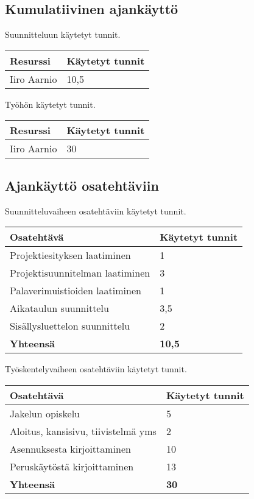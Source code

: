 \documentclass[a4paper, 12pt, finnish]{article}
\begin{document}
\subsection{Kumulatiivinen ajankäyttö}
Suunnitteluun käytetyt tunnit.
\begin{table}[htpb]
\begin{tabular}{|l|l|}
\hline
Resurssi & Käytetyt tunnit \\ \hline
Iiro Aarnio & 10,5 \\ \hline
\end{tabular}%
\end{table}

Työhön käytetyt tunnit.
\begin{table}[htpb]
\begin{tabular}{|l|l|}
\hline
Resurssi & Käytetyt tunnit \\ \hline
Iiro Aarnio & 30 \\ \hline
\end{tabular}%
\end{table}

\subsection{Ajankäyttö osatehtäviin}

Suunnitteluvaiheen osatehtäviin käytetyt tunnit.
\begin{table}[!htpb]
\begin{tabular}{|l|l|}
\hline
Osatehtävä & Käytetyt tunnit \\ \hline
Projektiesityksen laatiminen & 1 \\ \hline
Projektisuunnitelman laatiminen & 3 \\ \hline
Palaverimuistioiden laatiminen & 1 \\ \hline
Aikataulun suunnittelu & 3,5 \\ \hline
Sisällysluettelon suunnittelu & 2 \\ \hline
    \textbf{Yhteensä} & \textbf{10,5}  \\ \hline
\end{tabular}%
\end{table}

Työskentelyvaiheen osatehtäviin käytetyt tunnit.
\begin{table}[!htpb]
\begin{tabular}{|l|l|}
\hline
Osatehtävä & Käytetyt tunnit \\ \hline
Jakelun opiskelu & 5 \\ \hline
Aloitus, kansisivu, tiivistelmä yms & 2 \\\hline
Asennuksesta kirjoittaminen & 10 \\\hline
Peruskäytöstä kirjoittaminen & 13 \\\hline
    \textbf{Yhteensä} & \textbf{30}  \\ \hline
\end{tabular}%
\end{table}
\end{document}
